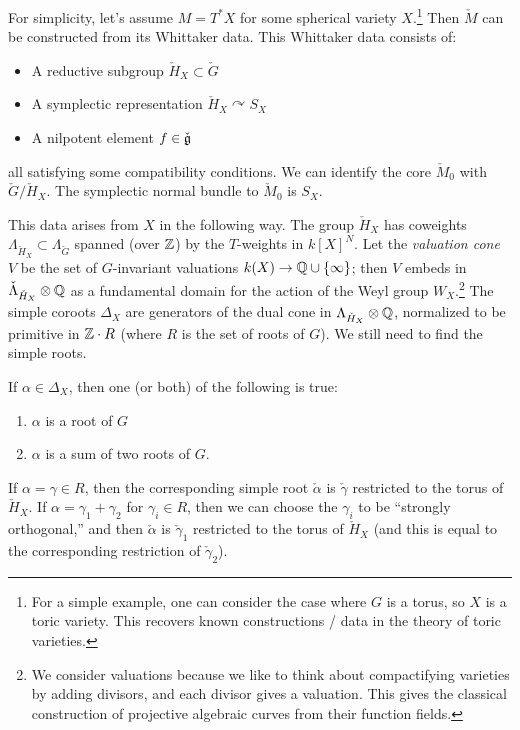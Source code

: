 \documentclass{article}
\begin{document}
For simplicity, let's assume $M = T^*X$ for some spherical variety $X$.\footnote{For a simple example, one can consider the case where $G$ is a torus, so $X$ is a toric variety.
This recovers known constructions / data in the theory of toric varieties.}
Then $\check{M}$ can be constructed from its Whittaker data.
This Whittaker data consists of:
\begin{itemize}
	\item A reductive subgroup $\check{H}_X \subset \check{G}$
	\item A symplectic representation $\check{H}_X \curvearrowright S_X$
	\item A nilpotent element $f \in \check{\mathfrak{g}}$
\end{itemize}
all satisfying some compatibility conditions.
We can identify the core $\check{M}_0$ with $\check{G} / \check{H}_X$.
The symplectic normal bundle to $\check{M}_0$ is $S_X$.

This data arises from $X$ in the following way.
The group $\check{H}_X$ has coweights $\Lambda_{\check{H}_X} \subset \Lambda_{\check{G}}$ spanned (over $\mathbb{Z}$) by the $T$-weights in $k[X]^N$.
Let the \emph{valuation cone} $V$ be the set of $G$-invariant valuations $k(X) \to \mathbb{Q} \cup \{ \infty \}$; then $V$ embeds in $\check{\Lambda}_{\check{H}_X} \otimes \mathbb{Q}$ as a fundamental domain for the action of the Weyl group $W_X$.\footnote{We consider valuations because we like to think about compactifying varieties by adding divisors, and each divisor gives a valuation.
This gives the classical construction of projective algebraic curves from their function fields.}
The simple coroots $\Delta_X$ are generators of the dual cone in $\Lambda_{\check{H}_X} \otimes \mathbb{Q}$, normalized to be primitive in $\mathbb{Z} \cdot R$ (where $R$ is the set of roots of $G$).
We still need to find the simple roots.

\begin{prop}
	If $\alpha \in \Delta_X$, then one (or both) of the following is true:
	\begin{enumerate}
		\item $\alpha$ is a root of $G$
		\item $\alpha$ is a sum of two roots of $G$.
	\end{enumerate}
\end{prop}

If $\alpha = \gamma \in R$, then the corresponding simple root $\check{\alpha}$ is $\check{\gamma}$ restricted to the torus of $\check{H}_X$.
If $\alpha = \gamma_1 + \gamma_2$ for $\gamma_i \in R$, then we can choose the $\gamma_i$ to be ``strongly orthogonal,'' and then $\check{\alpha}$ is $\check{\gamma}_1$ restricted to the torus of $\check{H}_X$ (and this is equal to the corresponding restriction of $\check{\gamma}_2$).
\end{document}
